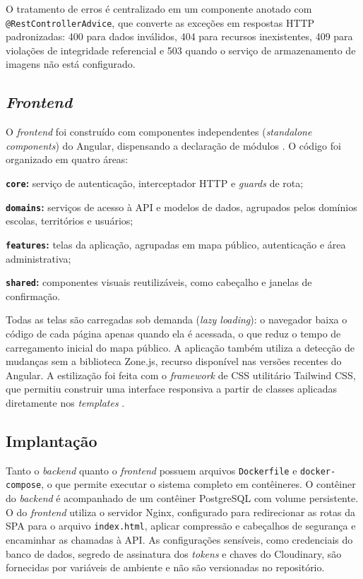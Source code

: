 O tratamento de erros é centralizado em um componente anotado com \texttt{@RestControllerAdvice}, que converte as exceções em respostas HTTP padronizadas: 400 para dados inválidos, 404 para recursos inexistentes, 409 para violações de integridade referencial e 503 quando o serviço de armazenamento de imagens não está configurado.

\subsection{\textit{Frontend}}

O \textit{frontend} foi construído com componentes independentes (\textit{standalone components}) do Angular, dispensando a declaração de módulos \cite{angular2023}. O código foi organizado em quatro áreas:

\begin{alineas}
  \item \textbf{\texttt{core}:} serviço de autenticação, interceptador HTTP e \textit{guards} de rota;
  \item \textbf{\texttt{domains}:} serviços de acesso à API e modelos de dados, agrupados pelos domínios escolas, territórios e usuários;
  \item \textbf{\texttt{features}:} telas da aplicação, agrupadas em mapa público, autenticação e área administrativa;
  \item \textbf{\texttt{shared}:} componentes visuais reutilizáveis, como cabeçalho e janelas de confirmação.
\end{alineas}

Todas as telas são carregadas sob demanda (\textit{lazy loading}): o navegador baixa o código de cada página apenas quando ela é acessada, o que reduz o tempo de carregamento inicial do mapa público. A aplicação também utiliza a detecção de mudanças sem a biblioteca Zone.js, recurso disponível nas versões recentes do Angular. A estilização foi feita com o \textit{framework} de CSS utilitário Tailwind CSS, que permitiu construir uma interface responsiva a partir de classes aplicadas diretamente nos \textit{templates} \cite{freeman2019}.

\subsection{Implantação}

Tanto o \textit{backend} quanto o \textit{frontend} possuem arquivos \texttt{Dockerfile} e \texttt{docker-compose}, o que permite executar o sistema completo em contêineres. O contêiner do \textit{backend} é acompanhado de um contêiner PostgreSQL com volume persistente. O do \textit{frontend} utiliza o servidor Nginx, configurado para redirecionar as rotas da SPA para o arquivo \texttt{index.html}, aplicar compressão e cabeçalhos de segurança e encaminhar as chamadas à API. As configurações sensíveis, como credenciais do banco de dados, segredo de assinatura dos \textit{tokens} e chaves do Cloudinary, são fornecidas por variáveis de ambiente e não são versionadas no repositório.

